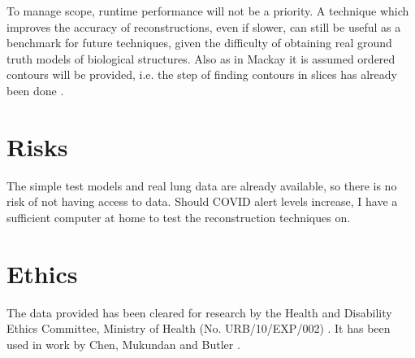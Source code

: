 \documentclass[12pt]{article}
\begin{document}
To manage scope, runtime performance will not be a priority. A technique which improves the accuracy of reconstructions, even if slower, can still be useful as a benchmark for future techniques, given the difficulty of obtaining real ground truth models of biological structures. Also as in Mackay it is assumed ordered contours will be provided, i.e. the step of finding contours in slices has already been done \cite{mukundan2016reconstruction}.

\section{Risks}
The simple test models and real lung data are already available, so there is no risk of not having access to data. Should COVID alert levels increase, I have a sufficient computer at home to test the reconstruction techniques on.

\section{Ethics}
The data provided has been cleared for research by the Health and Disability Ethics Committee, Ministry of Health (No. URB/10/EXP/002) \cite{health2010annual}. It has been used in work by Chen, Mukundan and Butler \cite{chen2011automatic}.

\pagebreak


\end{document}
